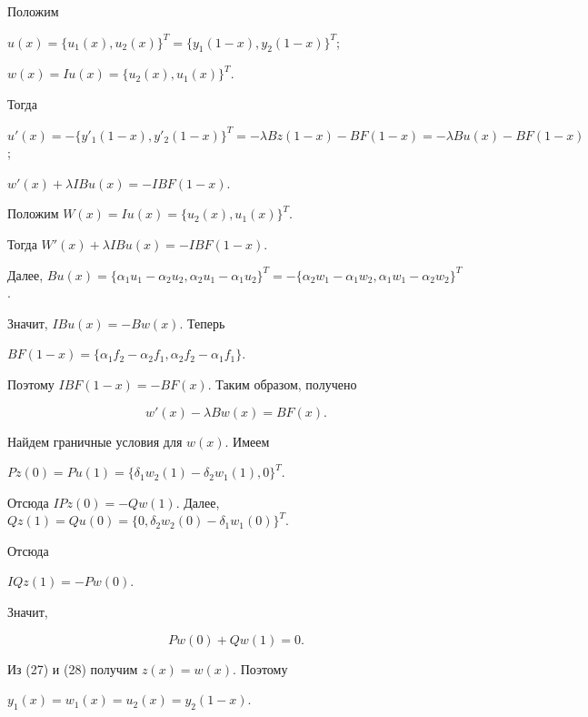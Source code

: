 \begin{pf}


Положим


$u(x)=\{ u_1(x),u_2(x)\}^T=\{ y_1(1-x),y_2(1-x)\}^T$;


$w(x)=Iu(x)=\{ u_2(x),u_1(x)\}^T$.


Тогда


$u'(x)=-\{ y'_1(1-x),y'_2(1-x)\}^T=-\lambda Bz(1-x)-BF(1-x)=


-\lambda Bu(x)-BF(1-x)$;


$w'(x)+\lambda IBu(x)=-IBF(1-x).$


Положим $W(x)=Iu(x)=\{u_2(x),u_1(x)\}^T$.


Тогда $W'(x)+\lambda IBu(x)=-IBF(1-x).$


Далее, $Bu(x)=\{ \alpha_1u_1-\alpha_2u_2,\alpha_2u_1-\alpha_1u_2\}^T=


-\{\alpha_2w_1-\alpha_1w_2,\alpha_1w_1-\alpha_2w_2\}^T$.


Значит, $IBu(x)=-Bw(x)$. Теперь


$BF(1-x)=\{ \alpha_1f_2-\alpha_2f_1,\alpha_2f_2-\alpha_1f_1\}.$


Поэтому $IBF(1-x)=-BF(x)$. Таким образом, получено


\begin{equation}


w'(x)-\lambda Bw(x)=BF(x).


\end{equation}


Найдем граничные условия для $w(x)$. Имеем


$Pz(0)=Pu(1)=\{\delta_1w_2(1)-\delta_2w_1(1),0\}^T$.


Отсюда $IPz(0)=-Qw(1)$. Далее, $Qz(1)=Qu(0)=\{0,\delta_2w_2(0)-


\delta_1w_1(0)\}^T$.


Отсюда


$IQz(1)=-Pw(0).$


Значит,


\begin{equation}


Pw(0)+Qw(1)=0.


\end{equation}


Из (27) и (28) получим $z(x)=w(x)$. Поэтому


$y_1(x)=w_1(x)=u_2(x)=y_2(1-x)$.


\end{pf}





